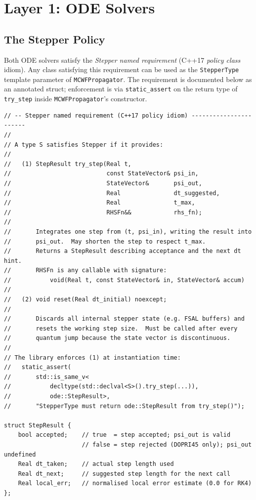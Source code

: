\documentclass[11pt,a4paper,twoside]{book}
\newcommand{\code}[1]{\texttt{\small#1}}
\theoremstyle{definition}
\theoremstyle{remark}
\begin{document}
\chapter{Layer 1: ODE Solvers}
\label{chap:ode}

\section{The Stepper Policy}
\label{sec:stepper-concept}

Both ODE solvers satisfy the \emph{Stepper named requirement} (C++17
\emph{policy class} idiom). Any class satisfying this requirement can
be used as the \code{StepperType} template parameter of
\code{MCWFPropagator}. The requirement is documented below as an
annotated struct; enforcement is via \code{static\_assert} on the
return type of \code{try\_step} inside \code{MCWFPropagator}'s
constructor.

\begin{verbatim}
// -- Stepper named requirement (C++17 policy idiom) -----------------------
//
// A type S satisfies Stepper if it provides:
//
//   (1) StepResult try_step(Real t,
//                           const StateVector& psi_in,
//                           StateVector&       psi_out,
//                           Real               dt_suggested,
//                           Real               t_max,
//                           RHSFn&&            rhs_fn);
//
//       Integrates one step from (t, psi_in), writing the result into
//       psi_out.  May shorten the step to respect t_max.
//       Returns a StepResult describing acceptance and the next dt hint.
//       RHSFn is any callable with signature:
//           void(Real t, const StateVector& in, StateVector& accum)
//
//   (2) void reset(Real dt_initial) noexcept;
//
//       Discards all internal stepper state (e.g. FSAL buffers) and
//       resets the working step size.  Must be called after every
//       quantum jump because the state vector is discontinuous.
//
// The library enforces (1) at instantiation time:
//   static_assert(
//       std::is_same_v<
//           decltype(std::declval<S>().try_step(...)),
//           ode::StepResult>,
//       "StepperType must return ode::StepResult from try_step()");

struct StepResult {
    bool accepted;    // true  = step accepted; psi_out is valid
                      // false = step rejected (DOPRI45 only); psi_out undefined
    Real dt_taken;    // actual step length used
    Real dt_next;     // suggested step length for the next call
    Real local_err;   // normalised local error estimate (0.0 for RK4)
};
\end{verbatim}
\end{document}
